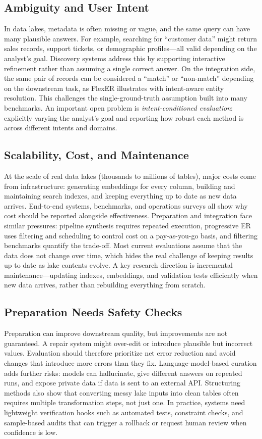 \documentclass[sigconf]{acmart}
\begin{document}
\subsection{Ambiguity and User Intent}
In data lakes, metadata is often missing or vague, and the same query can have many plausible answers. For example, searching for ``customer data'' might return sales records, support tickets, or demographic profiles---all valid depending on the analyst's goal. Discovery systems address this by supporting interactive refinement rather than assuming a single correct answer. On the integration side, the same pair of records can be considered a ``match'' or ``non-match'' depending on the downstream task, as FlexER illustrates with intent-aware entity resolution. This challenges the single-ground-truth assumption built into many benchmarks. An important open problem is \emph{intent-conditioned evaluation}: explicitly varying the analyst's goal and reporting how robust each method is across different intents and domains.

\subsection{Scalability, Cost, and Maintenance}
At the scale of real data lakes (thousands to millions of tables), major costs come from infrastructure: generating embeddings for every column, building and maintaining search indexes, and keeping everything up to date as new data arrives. End-to-end systems, benchmarks, and operations surveys all show why cost should be reported alongside effectiveness. Preparation and integration face similar pressures: pipeline synthesis requires repeated execution, progressive ER uses filtering and scheduling to control cost on a pay-as-you-go basis, and filtering benchmarks quantify the trade-off. Most current evaluations assume that the data does not change over time, which hides the real challenge of keeping results up to date as lake contents evolve. A key research direction is incremental maintenance---updating indexes, embeddings, and validation tests efficiently when new data arrives, rather than rebuilding everything from scratch.

\subsection{Preparation Needs Safety Checks}
Preparation can improve downstream quality, but improvements are not guaranteed. A repair system might over-edit or introduce plausible but incorrect values. Evaluation should therefore prioritize net error reduction and avoid changes that introduce more errors than they fix. Language-model-based curation adds further risks: models can hallucinate, give different answers on repeated runs, and expose private data if data is sent to an external API. Structuring methods also show that converting messy lake inputs into clean tables often requires multiple transformation steps, not just one. In practice, systems need lightweight verification hooks such as automated tests, constraint checks, and sample-based audits that can trigger a rollback or request human review when confidence is low.
\end{document}
